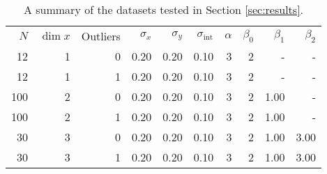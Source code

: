\begin{table*}
	\centering
	\caption{A summary of the datasets tested in Section \ref{sec:results}.}
	\label{tab:results.datasets}
    \begin{tabular}{rrrrrrrrrr}
$N$ & $\dim x$ & Outliers & $\sigma_{x}$ & $\sigma_{y}$ & $\sigma_{\text{int}}$ & $\alpha$ & $\beta_0$ & $\beta_1$ & $\beta_2$ \\
12 & 1 & 0 & 0.20 & 0.20 & 0.10 & 3 & 2 & - & - \\
12 & 1 & 1 & 0.20 & 0.20 & 0.10 & 3 & 2 & - & - \\
100 & 2 & 0 & 0.20 & 0.20 & 0.10 & 3 & 2 & 1.00 & - \\
100 & 2 & 1 & 0.20 & 0.20 & 0.10 & 3 & 2 & 1.00 & - \\
30 & 3 & 0 & 0.20 & 0.20 & 0.10 & 3 & 2 & 1.00 & 3.00 \\
30 & 3 & 1 & 0.20 & 0.20 & 0.10 & 3 & 2 & 1.00 & 3.00 \\
\end{tabular}

\end{table*}
